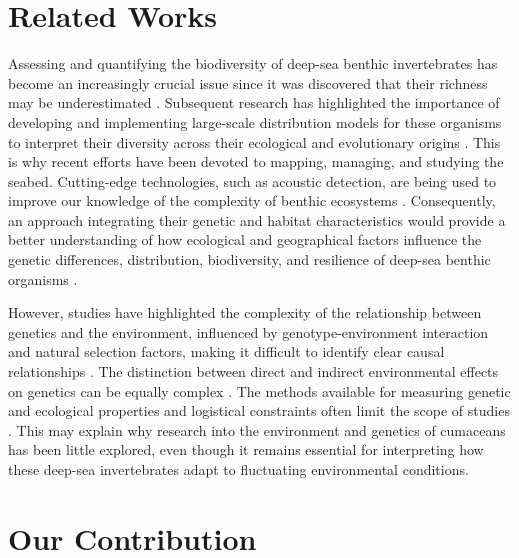 \section{Related Works}\label{related-works}
Assessing and quantifying the biodiversity of deep-sea benthic invertebrates has become an increasingly crucial issue since it was discovered that their richness may be underestimated \citep{grassle1992deep}. Subsequent research has highlighted the importance of developing and implementing large-scale distribution models for these organisms to interpret their diversity across their ecological and evolutionary origins \citep{rex1997large}. This is why recent efforts have been devoted to mapping, managing, and studying the seabed. Cutting-edge technologies, such as acoustic detection, are being used to improve our knowledge of the complexity of benthic ecosystems \citep{brown2011benthic}. Consequently, an approach integrating their genetic and habitat characteristics would provide a better understanding of how ecological and geographical factors influence the genetic differences, distribution, biodiversity, and resilience of deep-sea benthic organisms \citep{etter1990population, vrijenhoek2009cryptic}.

However, studies have highlighted the complexity of the relationship between genetics and the environment, influenced by genotype-environment interaction and natural selection factors, making it difficult to identify clear causal relationships \citep{balkenhol_identifying_2009}. The distinction between direct and indirect environmental effects on genetics can be equally complex \citep{manel_perspectives_2010, balkenhol_landscape_2019}. The methods available for measuring genetic and ecological properties and logistical constraints often limit the scope of studies \citep{manel_perspectives_2010, shafer_widespread_2013}. This may explain why research into the environment and genetics of cumaceans has been little explored, even though it remains essential for interpreting how these deep-sea invertebrates adapt to fluctuating environmental conditions.

\section{Our Contribution}\label{contribution}

